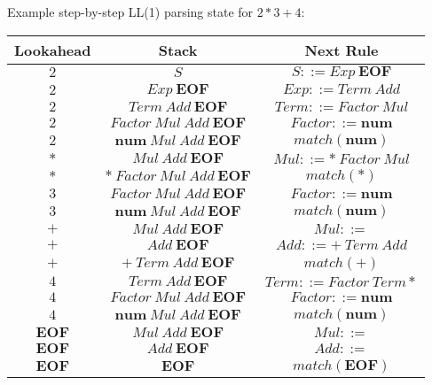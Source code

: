 \begin{exercise}{}
\begin{solution}
\begin{enumerate}
      Example step-by-step LL(1) parsing state for \(2 * 3 + 4\):
      \begin{center}
        \begin{tabular}{c c c}
          Lookahead & Stack & Next Rule \\
          \hline
          \(2\) & \(S\) & \(S ::= Exp ~\mathbf{EOF}\)\\
          \(2\) & \(Exp ~ \mathbf{EOF}\) & \(Exp ::= Term~Add\)\\
          \(2\) & \(Term ~ Add ~ \mathbf{EOF}\) & \(Term ::= Factor~Mul\)\\
          \(2\) & \(Factor ~ Mul ~ Add ~ \mathbf{EOF}\) & \(Factor ::= \mathbf{num}\)\\
          \(2\) & \(\mathbf{num} ~ Mul ~ Add ~ \mathbf{EOF}\) & \(match(\mathbf{num})\)\\
          \(*\) & \(Mul ~ Add ~ \mathbf{EOF}\) & \(Mul ::= *~Factor~Mul\)\\
          \(*\) & \(* ~Factor ~ Mul ~ Add ~ \mathbf{EOF}\) & \(match(*)\)\\
          \(3\) & \(Factor ~ Mul ~ Add ~ \mathbf{EOF}\) & \(Factor ::= \mathbf{num}\)\\
          \(3\) & \(\mathbf{num} ~ Mul ~ Add ~ \mathbf{EOF}\) & \(match(\mathbf{num})\)\\
          \(+\) & \(Mul ~ Add ~ \mathbf{EOF}\) & \(Mul ::=\)\\
          \(+\) & \(Add ~ \mathbf{EOF}\) & \(Add ::= +~Term~Add\)\\
          \(+\) & \(+ ~Term ~Add ~ \mathbf{EOF}\) & \(match(+)\)\\
          \(4\) & \(Term ~Add ~ \mathbf{EOF}\) & \(Term ::= Factor~Term*\)\\
          \(4\) & \(Factor ~Mul ~Add ~ \mathbf{EOF}\) & \(Factor ::= \mathbf{num}\)\\
          \(4\) & \(\mathbf{num} ~Mul ~Add ~ \mathbf{EOF}\) & \(match(\mathbf{num})\)\\
          \(\mathbf{EOF}\) & \(Mul ~Add ~ \mathbf{EOF}\) & \(Mul ::= \)\\
          \(\mathbf{EOF}\) & \(Add ~ \mathbf{EOF}\) & \(Add ::= \)\\
          \(\mathbf{EOF}\) & \(\mathbf{EOF}\) & \(match(\mathbf{EOF})\)\\
        \end{tabular}
      \end{center}
    \end{enumerate}
  \end{solution}

\end{exercise}

